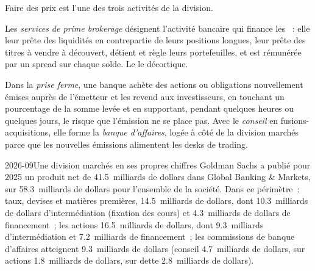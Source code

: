 Faire des prix est l'une des trois activités de la division.

\begin{definition}\label{def:m1:the-sell-side:prime}
Les \emph{services de prime brokerage} désignent l'activité bancaire qui
finance les ~: elle leur prête des liquidités en contrepartie de leurs positions longues,
leur prête des titres à vendre à découvert, détient et règle leurs portefeuilles, et est
rémunérée par un spread sur chaque solde. Le  le décortique.
\end{definition}

\begin{definition}\label{def:m1:the-sell-side:underwriting}
Dans la \emph{prise ferme}, une banque achète des actions ou
obligations nouvellement émises auprès de l'émetteur et les revend aux investisseurs, en touchant un pourcentage de
la somme levée et en supportant, pendant quelques heures ou quelques jours, le risque que
l'émission ne se place pas. Avec le \emph{conseil} en fusions-acquisitions, elle forme la
\emph{banque d'affaires}, logée à côté de la division marchés parce que les
nouvelles émissions alimentent les desks de trading.
\end{definition}

\begin{dated}{2026-09}{Une division marchés en ses propres chiffres}\label{dat:m1:the-sell-side:gs}
Goldman Sachs a publié pour 2025 un produit net de 41.5~milliards de dollars dans Global Banking
\& Markets, sur 58.3~milliards de dollars pour l'ensemble de la société. Dans ce périmètre~: taux,
devises et matières premières, 14.5~milliards de dollars, dont 10.3~milliards de dollars
d'intermédiation (fixation des cours) et 4.3~milliards de dollars de financement~; les actions
16.5~milliards de dollars, dont 9.3~milliards d'intermédiation et 7.2~milliards
de financement~; les commissions de banque d'affaires atteignent 9.3~milliards de dollars (conseil 4.7~milliards de dollars,
 sur actions 1.8~milliards de dollars,  sur dette 2.8~milliards de dollars).
\end{dated}

